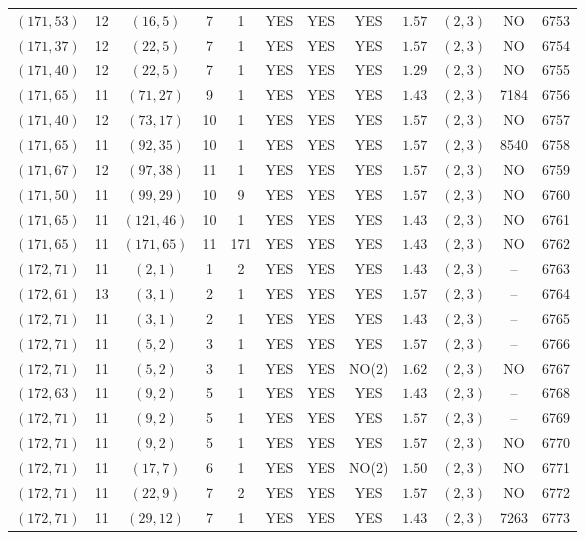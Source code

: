\begin{longtable}{|c|c|c|c|c|c|c|c|c|c|c|c|}
$(171,53)$ & 12 & $(16,5)$ & 7 & 1 & YES & YES & YES & $1.57$ & $(2,3)$ & NO & 6753\\
$(171,37)$ & 12 & $(22,5)$ & 7 & 1 & YES & YES & YES & $1.57$ & $(2,3)$ & NO & 6754\\
$(171,40)$ & 12 & $(22,5)$ & 7 & 1 & YES & YES & YES & $1.29$ & $(2,3)$ & NO & 6755\\
$(171,65)$ & 11 & $(71,27)$ & 9 & 1 & YES & YES & YES & $1.43$ & $(2,3)$ & 7184 & 6756\\
$(171,40)$ & 12 & $(73,17)$ & 10 & 1 & YES & YES & YES & $1.57$ & $(2,3)$ & NO & 6757\\
$(171,65)$ & 11 & $(92,35)$ & 10 & 1 & YES & YES & YES & $1.57$ & $(2,3)$ & 8540 & 6758\\
$(171,67)$ & 12 & $(97,38)$ & 11 & 1 & YES & YES & YES & $1.57$ & $(2,3)$ & NO & 6759\\
$(171,50)$ & 11 & $(99,29)$ & 10 & 9 & YES & YES & YES & $1.57$ & $(2,3)$ & NO & 6760\\
$(171,65)$ & 11 & $(121,46)$ & 10 & 1 & YES & YES & YES & $1.43$ & $(2,3)$ & NO & 6761\\
$(171,65)$ & 11 & $(171,65)$ & 11 & 171 & YES & YES & YES & $1.43$ & $(2,3)$ & NO & 6762\\
$(172,71)$ & 11 & $(2,1)$ & 1 & 2 & YES & YES & YES & $1.43$ & $(2,3)$ & -- & 6763\\
$(172,61)$ & 13 & $(3,1)$ & 2 & 1 & YES & YES & YES & $1.57$ & $(2,3)$ & -- & 6764\\
$(172,71)$ & 11 & $(3,1)$ & 2 & 1 & YES & YES & YES & $1.43$ & $(2,3)$ & -- & 6765\\
$(172,71)$ & 11 & $(5,2)$ & 3 & 1 & YES & YES & YES & $1.57$ & $(2,3)$ & -- & 6766\\
$(172,71)$ & 11 & $(5,2)$ & 3 & 1 & YES & YES & NO(2) & $1.62$ & $(2,3)$ & NO & 6767\\
$(172,63)$ & 11 & $(9,2)$ & 5 & 1 & YES & YES & YES & $1.43$ & $(2,3)$ & -- & 6768\\
$(172,71)$ & 11 & $(9,2)$ & 5 & 1 & YES & YES & YES & $1.57$ & $(2,3)$ & -- & 6769\\
$(172,71)$ & 11 & $(9,2)$ & 5 & 1 & YES & YES & YES & $1.57$ & $(2,3)$ & NO & 6770\\
$(172,71)$ & 11 & $(17,7)$ & 6 & 1 & YES & YES & NO(2) & $1.50$ & $(2,3)$ & NO & 6771\\
$(172,71)$ & 11 & $(22,9)$ & 7 & 2 & YES & YES & YES & $1.57$ & $(2,3)$ & NO & 6772\\
$(172,71)$ & 11 & $(29,12)$ & 7 & 1 & YES & YES & YES & $1.43$ & $(2,3)$ & 7263 & 6773\\

\end{longtable}
